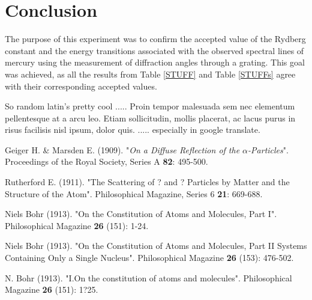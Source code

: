 \documentclass[prb,preprint]{revtex4-1}
\begin{document}
\section{Conclusion}

The purpose of this experiment was to confirm the accepted value of the Rydberg constant and the energy transitions associated with the observed spectral lines of mercury using the measurement of diffraction angles through a grating. This goal was achieved, as all the results from Table \ref{STUFF} and Table \ref{STUFFs} agree with their corresponding accepted values.

\newpage

\begin{acknowledgments}

So random latin's pretty cool .....
Proin tempor malesuada sem nec elementum pellentesque at a arcu leo. Etiam sollicitudin, mollis placerat, ac lacus purus in risus facilisis nisl ipsum, dolor quis.
..... especially in google translate.

\end{acknowledgments}


\begin{thebibliography}{99}

 Geiger H. \& Marsden E. (1909). "\textit{On a Diffuse Reflection of the $\alpha$-Particles}". Proceedings of the Royal Society, Series A \textbf{82}: 495-500.

 Rutherford E. (1911). "The Scattering of ? and ? Particles by Matter and the Structure of the Atom". Philosophical Magazine, Series 6 \textbf{21}: 669-688.

 Niels Bohr (1913). "On the Constitution of Atoms and Molecules, Part I". Philosophical Magazine \textbf{26} (151): 1-24.

 Niels Bohr (1913). "On the Constitution of Atoms and Molecules, Part II Systems Containing Only a Single Nucleus". Philosophical Magazine \textbf{26} (153): 476-502.

 N. Bohr (1913). "I.On the constitution of atoms and molecules". Philosophical Magazine \textbf{26} (151): 1?25.

\end{thebibliography}
\end{document}
